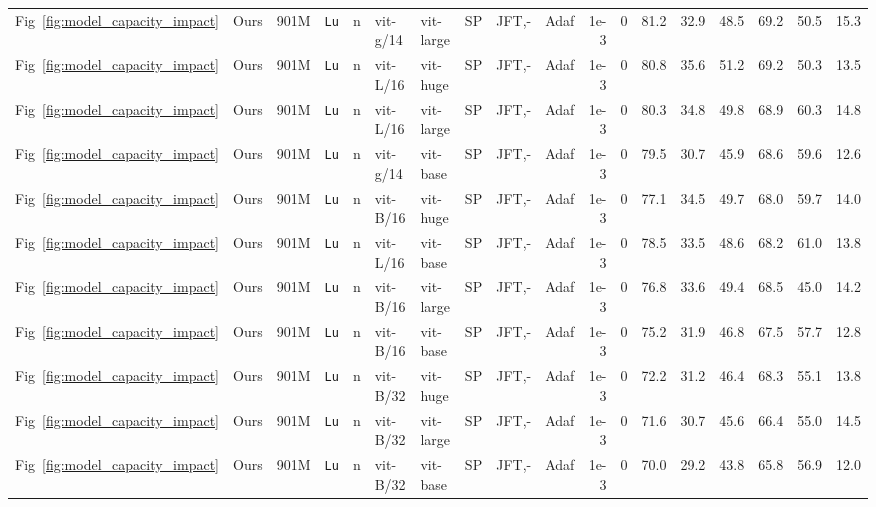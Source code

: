\documentclass[10pt,twocolumn,letterpaper]{article}
\def \Lu {{\tt Lu}\xspace}
\begin{document}
\begin{table*}
{\begin{tabular}{@{}llrlll@{\hspace{0.3ex}}llllrlrrrrrr@{}}
      Fig~\ref{fig:model_capacity_impact} &    Ours &   901M &  \Lu &  n &     vit-g/14 &   vit-large &  SP &     JFT,- &  Adaf & 1e-3 &     0 & 81.2 &            32.9 &            48.5 & 69.2 & 50.5 & 15.3 \\
      Fig~\ref{fig:model_capacity_impact} &    Ours &   901M &  \Lu &  n &     vit-L/16 &    vit-huge &  SP &     JFT,- &  Adaf & 1e-3 &     0 & 80.8 &            35.6 &            51.2 & 69.2 & 50.3 & 13.5 \\
      Fig~\ref{fig:model_capacity_impact} &    Ours &   901M &  \Lu &  n &     vit-L/16 &   vit-large &  SP &     JFT,- &  Adaf & 1e-3 &     0 & 80.3 &            34.8 &            49.8 & 68.9 & 60.3 & 14.8 \\
      Fig~\ref{fig:model_capacity_impact} &    Ours &   901M &  \Lu &  n &     vit-g/14 &    vit-base &  SP &     JFT,- &  Adaf & 1e-3 &     0 & 79.5 &            30.7 &            45.9 & 68.6 & 59.6 & 12.6 \\
      Fig~\ref{fig:model_capacity_impact} &    Ours &   901M &  \Lu &  n &     vit-B/16 &    vit-huge &  SP &     JFT,- &  Adaf & 1e-3 &     0 & 77.1 &            34.5 &            49.7 & 68.0 & 59.7 & 14.0 \\
      Fig~\ref{fig:model_capacity_impact} &    Ours &   901M &  \Lu &  n &     vit-L/16 &    vit-base &  SP &     JFT,- &  Adaf & 1e-3 &     0 & 78.5 &            33.5 &            48.6 & 68.2 & 61.0 & 13.8 \\
      Fig~\ref{fig:model_capacity_impact} &    Ours &   901M &  \Lu &  n &     vit-B/16 &   vit-large &  SP &     JFT,- &  Adaf & 1e-3 &     0 & 76.8 &            33.6 &            49.4 & 68.5 & 45.0 & 14.2 \\
      Fig~\ref{fig:model_capacity_impact} &    Ours &   901M &  \Lu &  n &     vit-B/16 &    vit-base &  SP &     JFT,- &  Adaf & 1e-3 &     0 & 75.2 &            31.9 &            46.8 & 67.5 & 57.7 & 12.8 \\
      Fig~\ref{fig:model_capacity_impact} &    Ours &   901M &  \Lu &  n &     vit-B/32 &    vit-huge &  SP &     JFT,- &  Adaf & 1e-3 &     0 & 72.2 &            31.2 &            46.4 & 68.3 & 55.1 & 13.8 \\
      Fig~\ref{fig:model_capacity_impact} &    Ours &   901M &  \Lu &  n &     vit-B/32 &   vit-large &  SP &     JFT,- &  Adaf & 1e-3 &     0 & 71.6 &            30.7 &            45.6 & 66.4 & 55.0 & 14.5 \\
      Fig~\ref{fig:model_capacity_impact} &    Ours &   901M &  \Lu &  n &     vit-B/32 &    vit-base &  SP &     JFT,- &  Adaf & 1e-3 &     0 & 70.0 &            29.2 &            43.8 & 65.8 & 56.9 & 12.0 \\

\end{tabular}}
\end{table*}
\end{document}
